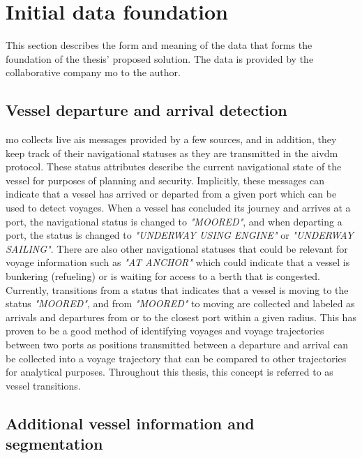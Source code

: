 \section{Initial data foundation}

This section describes the form and meaning of the data that forms the foundation of the thesis' proposed solution. The data is provided by the collaborative company \acrfull{mo} to the author.

\subsection{Vessel departure and arrival detection}
\label{sec:vessel_transitions}

\acrshort{mo} collects live \acrshort{ais} messages provided by a few sources, and in addition, they keep track of their navigational statuses as they are transmitted in the \gls{aivdm} protocol. These status attributes describe the current navigational state of the vessel for purposes of planning and security. Implicitly, these messages can indicate that a vessel has arrived or departed from a given port which can be used to detect voyages. When a vessel has concluded its journey and arrives at a port, the navigational status is changed to \textit{"MOORED"}, and when departing a port, the status is changed to \textit{"UNDERWAY USING ENGINE"} or \textit{"UNDERWAY SAILING"}. There are also other navigational statuses that could be relevant for voyage information such as \textit{"AT ANCHOR"} which could indicate that a vessel is bunkering (refueling) or is waiting for access to a berth that is congested. Currently, transitions from a status that indicates that a vessel is moving to the status \textit{"MOORED"}, and from \textit{"MOORED"} to moving are collected and labeled as arrivals and departures from or to the closest port within a given radius. This has proven to be a good method of identifying voyages and voyage trajectories between two ports as positions transmitted between a departure and arrival can be collected into a voyage trajectory that can be compared to other trajectories for analytical purposes. Throughout this thesis, this concept is referred to as vessel transitions.

\subsection{Additional vessel information and segmentation}
\label{sec:vessel_info_segments}

